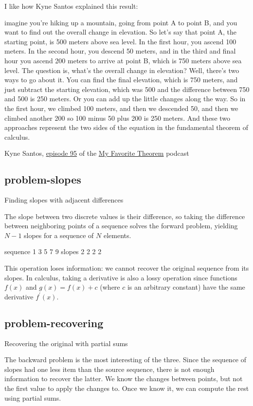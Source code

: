 \documentclass{article}
\begin{document}
I like how Kyne Santos explained this result:

\epigraph{
imagine you're hiking up a mountain, going from point A to point B, and you want to find out the overall change in elevation.
So let's say that point A, the starting point, is 500 meters above sea level.
In the first hour, you ascend 100 meters.
In the second hour, you descend 50 meters, and in the third and final hour you ascend 200 meters to arrive at point B, which is 750 meters above sea level.
The question is, what's the overall change in elevation? Well, there's two ways to go about it.
You can find the final elevation, which is 750 meters, and just subtract the starting elevation, which was 500 and the difference between 750 and 500 is 250 meters.
Or you can add up the little changes along the way.
So in the first hour, we climbed 100 meters, and then we descended 50, and then we climbed another 200 so 100 minus 50 plus 200 is 250 meters.
And these two approaches represent the two sides of the equation in the fundamental theorem of calculus.
}{Kyne Santos, \href{https://kpknudson.com/my-favorite-theorem/2025/5/15/episode-95-kyne-santos}{episode 95} of the \href{https://kpknudson.com/my-favorite-theorem}{My Favorite Theorem} podcast}

\subsection{problem-slopes}{Finding slopes with adjacent differences}

The slope between two discrete values is their difference,
so taking the difference between neighboring points of a sequence solves the forward problem,
yielding $N-1$ slopes for a sequence of $N$ elements.

\begin{code}
sequence  1  3  5  7  9
  slopes  2  2  2  2
\end{code}

This operation loses information:
we cannot recover the original sequence from its slopes.
In calculus, taking a derivative is also a lossy operation since functions
$f(x)$ and $g(x) = f(x) + c$
(where $c$ is an arbitrary constant) have the same derivative $f^\prime(x)$.

\subsection{problem-recovering}{Recovering the original with partial sums}

The backward problem is the most interesting of the three.
Since the sequence of slopes had one less item than the source sequence,
there is not enough information to recover the latter.
We know the changes between points,
but not the first value to apply the changes to.
Once we know it, we can compute the rest using partial sums.
\end{document}
